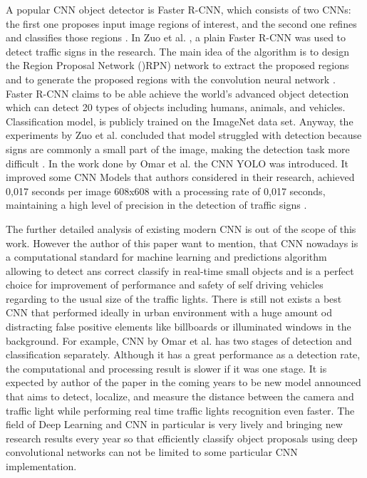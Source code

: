 \documentclass[letterpaper, 10 pt, conference]{ieeeconf} %
\begin{document}
A popular CNN object detector is Faster R-CNN, which consists of two CNNs: the first one proposes input image regions of interest, and the second one refines and classifies those regions \cite{c7}. In Zuo et al. \cite{c9}, a plain Faster R-CNN was used to detect traffic signs in the research. The main idea of the algorithm is to design the Region Proposal Network ()RPN) network to extract the proposed regions and to generate the proposed regions with the convolution neural network \cite{c9}. Faster R-CNN claims to be able achieve the world's advanced object detection which can detect 20 types of objects including humans, animals, and vehicles. Classification model, is publicly trained on the ImageNet data set. Anyway, the experiments by Zuo et al. concluded that model struggled with detection because signs are commonly a small part of the image, making the detection task more difficult \cite{c7}. In the work done by Omar et al. the CNN YOLO was introduced. It improved some CNN Models that authors considered in their research, achieved 0,017 seconds per image 608x608 with a processing rate of 0,017 seconds, maintaining a high level of precision in the detection of traffic signs \cite{c7}. 

The further detailed analysis of existing modern CNN is out of the scope of this work. However the author of this paper want to mention, that CNN nowadays is a computational standard for machine learning and predictions algorithm allowing to detect ans correct classify in real-time small objects and is a perfect choice for improvement of performance and safety of self driving vehicles regarding to the usual size of the traffic lights. There is still not exists a best CNN that performed ideally in urban environment with a huge amount od distracting false positive elements like billboards or illuminated windows in the background. For example, CNN by Omar et al. has two stages of detection and classification separately. Although it has a great performance as a detection rate, the computational and processing result is slower if it was one stage. It is expected by author of the paper in the coming years to be new model announced that aims to detect, localize, and measure the distance between the camera and traffic light while performing real time traffic lights recognition even faster. The field of Deep Learning and CNN in particular is very lively and bringing new research results every year so that efficiently classify object proposals using deep convolutional networks can not be limited to some particular CNN implementation. 
\end{document}
